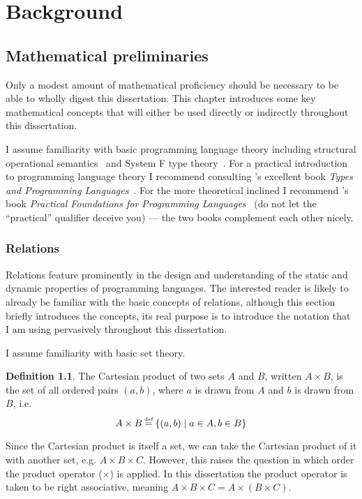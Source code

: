 \documentclass[12pt,phd,lfcs,twoside,openright,logo,leftchapter,normalheadings]{infthesis}
\theoremstyle{plain}
\theoremstyle{definition}
\newtheorem{definition}[theorem]{Definition}
\begin{document}
\part{Background}
\label{p:background}

\chapter{Mathematical preliminaries}
\label{ch:maths-prep}

Only a modest amount of mathematical proficiency should be necessary
to be able to wholly digest this dissertation.
%
This chapter introduces some key mathematical concepts that will
either be used directly or indirectly throughout this dissertation.
%

I assume familiarity with basic programming language theory including
structural operational semantics~\cite{Plotkin04a} and System F type
theory~\cite{Girard72}. For a practical introduction to programming
language theory I recommend consulting \citeauthor{Pierce02}'s
excellent book \emph{Types and Programming
  Languages}~\cite{Pierce02}. For the more theoretical inclined I
recommend \citeauthor{Harper16}'s book \emph{Practical Foundations for
  Programming Languages}~\cite{Harper16} (do not let the ``practical''
qualifier deceive you) --- the two books complement each other nicely.

\section{Relations}
\label{sec:relations}

Relations feature prominently in the design and understanding of the
static and dynamic properties of programming languages. The interested
reader is likely to already be familiar with the basic concepts of
relations, although this section briefly introduces the concepts, its
real purpose is to introduce the notation that I am using pervasively
throughout this dissertation.
%

I assume familiarity with basic set theory.

\begin{definition}
  The Cartesian product of two sets $A$ and $B$, written $A \times B$,
  is the set of all ordered pairs $(a, b)$, where $a$ is drawn from
  $A$ and $b$ is drawn from $B$, i.e.
  \[
    A \times B \defas \{ (a, b) \mid a \in A, b \in B \}
  \]
\end{definition}
%
Since the Cartesian product is itself a set, we can take the Cartesian
product of it with another set, e.g. $A \times B \times C$. However,
this raises the question in which order the product operator
($\times$) is applied. In this dissertation the product operator is
taken to be right associative, meaning
$A \times B \times C = A \times (B \times C)$.
%
%
%
\end{document}

